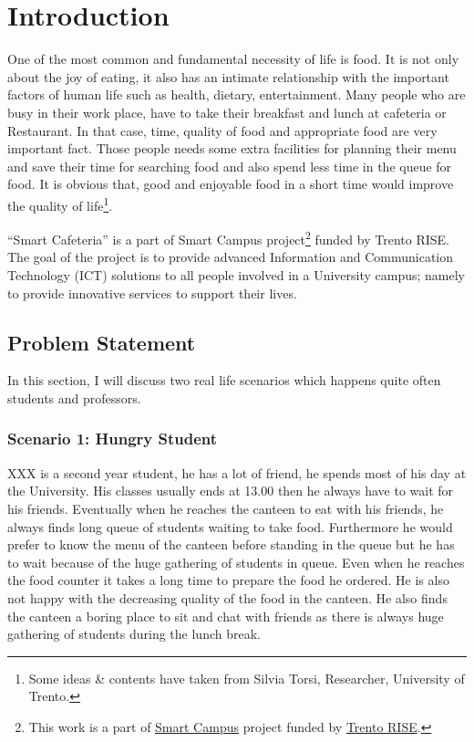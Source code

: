 \chapter{Introduction}
\label{chap:Introduction}
One of the most common and fundamental necessity of life is food. It is not only
about the joy of eating, it also has an intimate relationship with the important
factors of human life such as health, dietary, entertainment. Many people who
are busy in their work place, have to take their breakfast and lunch at
cafeteria or Restaurant. In that case, time, quality of food and appropriate
food are very important fact. Those people needs some extra facilities for
planning their menu and save their time for searching food and also spend less
time in the queue for food. It is obvious that, good and enjoyable food in a
short time would improve the quality of life\footnote{Some ideas \& contents
have taken from Silvia Torsi, Researcher, University of Trento.}.

``Smart Cafeteria'' is a part of Smart Campus project\footnote{This work is a
part of \href{http://www.smartcampuslab.it/}{Smart Campus} project funded by
\href{http://www.trentorise.eu/}{Trento RISE}.} funded by Trento RISE. The goal
of the project is to provide advanced Information and Communication Technology
(ICT) solutions to all people  involved in a University campus; namely to
provide innovative services to support their lives.

\section{Problem Statement}

In this section, I will discuss two real life scenarios which happens quite
often students and professors.

\subsection{Scenario 1: Hungry Student}
\label{HungryStudent}
XXX is a second year student, he has a lot of friend, he spends most of his day
at the University. His classes usually ends at 13.00 then he always have to
wait for his friends. Eventually when he reaches the canteen to eat with his
friends, he always finds long queue of students waiting to take food.
Furthermore he would prefer to know the menu of the canteen before standing in
the queue but he has to wait because of the huge gathering of students in queue.
Even when he reaches the food counter it takes a long time to prepare the food
he ordered. He is also not happy with the decreasing quality of the food in the
canteen. He also finds the canteen a  boring place to sit and chat with friends
as there is always huge gathering of students during the lunch break.

